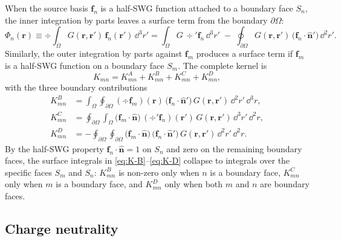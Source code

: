 \documentclass[11pt,a4paper]{article}
\begin{document}
When the source basis $\bm{f}_n$ is a half-SWG function attached to a
boundary face $S_n$, the inner integration by parts leaves a surface
term from the boundary $\partial\Omega$:
\begin{equation}
  \Phi_n(\bm{r})
    \equiv \div\!\int_{\Omega} G(\bm{r},\bm{r}')\,\bm{f}_n(\bm{r}')\,\dd^{3}r'
    = \int_{\Omega} G\,\div'\bm{f}_n\,\dd^{3}r'
      \;-\;\oint_{\partial\Omega}
          G(\bm{r},\bm{r}')\,\bigl(\bm{f}_n\!\cdot\!\hat{\bm{n}}'\bigr)\,
          \dd^{2}r'.
  \label{eq:scalar-potential}
\end{equation}
Similarly, the outer integration by parts against $\bm{f}_m$ produces a
surface term if $\bm{f}_m$ is a half-SWG function on a boundary face
$S_m$. The complete kernel is
\begin{equation}
  K_{mn} = K_{mn}^{A} + K_{mn}^{B} + K_{mn}^{C} + K_{mn}^{D},
  \label{eq:K-full}
\end{equation}
with the three boundary contributions
\begin{align}
  K_{mn}^{B}
    &= \int_{\Omega}\!\oint_{\partial\Omega}
       (\div\bm{f}_m)(\bm{r})\,\bigl(\bm{f}_n\!\cdot\!\hat{\bm{n}}'\bigr)\,
       G(\bm{r},\bm{r}')\,\dd^{2}r'\,\dd^{3}r,
  \label{eq:K-B} \\
  K_{mn}^{C}
    &= \oint_{\partial\Omega}\!\int_{\Omega}
       \bigl(\bm{f}_m\!\cdot\!\hat{\bm{n}}\bigr)\,(\div'\bm{f}_n)(\bm{r}')\,
       G(\bm{r},\bm{r}')\,\dd^{3}r'\,\dd^{2}r,
  \label{eq:K-C} \\
  K_{mn}^{D}
    &= -\oint_{\partial\Omega}\!\oint_{\partial\Omega}
       \bigl(\bm{f}_m\!\cdot\!\hat{\bm{n}}\bigr)\,
       \bigl(\bm{f}_n\!\cdot\!\hat{\bm{n}}'\bigr)\,
       G(\bm{r},\bm{r}')\,\dd^{2}r'\,\dd^{2}r.
  \label{eq:K-D}
\end{align}
By the half-SWG property $\bm{f}_n\!\cdot\!\hat{\bm{n}} = 1$ on $S_n$
and zero on the remaining boundary faces, the surface integrals in
\eqref{eq:K-B}--\eqref{eq:K-D} collapse to integrals over the specific
faces $S_m$ and $S_n$:
$K^{B}_{mn}$ is non-zero only when $n$ is a boundary face,
$K^{C}_{mn}$ only when $m$ is a boundary face, and $K^{D}_{mn}$ only
when both $m$ and $n$ are boundary faces.

\subsection{Charge neutrality}
\label{sec:charge-neutrality}
\end{document}
